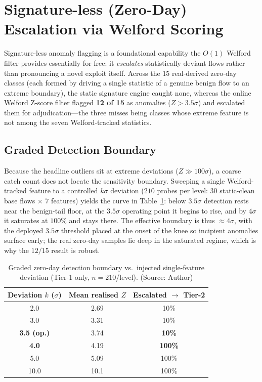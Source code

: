 \section{Signature-less (Zero-Day) Escalation via Welford Scoring}
Signature-less anomaly flagging is a foundational capability the $O(1)$ Welford filter provides essentially for free: it \emph{escalates} statistically deviant flows rather than pronouncing a novel exploit itself. Across the $15$ real-derived zero-day classes (each formed by driving a single statistic of a genuine benign flow to an extreme boundary), the static signature engine caught none, whereas the online Welford Z-score filter flagged \textbf{12 of 15} as anomalies ($Z>3.5\sigma$) and escalated them for adjudication---the three misses being classes whose extreme feature is not among the seven Welford-tracked statistics.

\subsection{Graded Detection Boundary}
Because the headline outliers sit at extreme deviations ($Z\!\gg\!100\sigma$), a coarse catch count does not locate the sensitivity boundary. Sweeping a single Welford-tracked feature to a controlled $k\sigma$ deviation ($210$ probes per level: $30$ static-clean base flows $\times$ $7$ features) yields the curve in Table~\ref{tab:zeroday_graded}: below $3.5\sigma$ detection rests near the benign-tail floor, at the $3.5\sigma$ operating point it begins to rise, and by $4\sigma$ it saturates at $100\%$ and stays there. The effective boundary is thus $\approx\!4\sigma$, with the deployed $3.5\sigma$ threshold placed at the onset of the knee so incipient anomalies surface early; the real zero-day samples lie deep in the saturated regime, which is why the $12/15$ result is robust.

\begin{table}[!htbp]
    \centering \footnotesize \setlength{\tabcolsep}{6pt}
    \caption{Graded zero-day detection boundary vs.\ injected single-feature deviation (Tier-1 only, $n=210$/level). (Source: Author)}
    \label{tab:zeroday_graded}
    \begin{tabular}{|c|c|c|}
        \hline
        \textbf{Deviation $k$ ($\sigma$)} & \textbf{Mean realised $Z$} & \textbf{Escalated $\rightarrow$ Tier-2} \\ \hline
        2.0 & 2.69 & 10\% \\ \hline
        3.0 & 3.31 & 10\% \\ \hline
        \textbf{3.5 (op.)} & 3.74 & \textbf{10\%} \\ \hline
        \textbf{4.0} & 4.19 & \textbf{100\%} \\ \hline
        5.0 & 5.09 & 100\% \\ \hline
        10.0 & 10.1 & 100\% \\ \hline
    \end{tabular}
\end{table}

